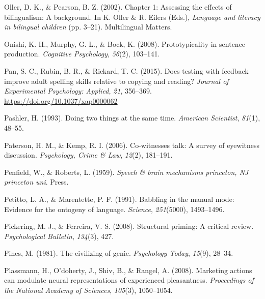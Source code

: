 \documentclass[
]{krantz}
\newlength{\cslhangindent}
\newlength{\cslentryspacingunit} %
\newenvironment{CSLReferences}[2] %
 {%
  \setlength{\parindent}{0pt}
  \ifodd #1
  \let\oldpar\par
  \def\par{\hangindent=\cslhangindent\oldpar}
  \fi
  \setlength{\parskip}{#2\cslentryspacingunit}
 }%
 {}
\begin{document}
\begin{CSLReferences}{1}{0}
\leavevmode{}%
Oller, D. K., \& Pearson, B. Z. (2002). Chapter 1: Assessing the effects of bilingualism: A background. In K. Oller \& R. Eilers (Eds.), \emph{Language and literacy in bilingual children} (pp. 3--21). Multilingual Matters.

\leavevmode{}%
Onishi, K. H., Murphy, G. L., \& Bock, K. (2008). Prototypicality in sentence production. \emph{Cognitive Psychology}, \emph{56}(2), 103--141.

\leavevmode{}%
Pan, S. C., Rubin, B. R., \& Rickard, T. C. (2015). Does testing with feedback improve adult spelling skills relative to copying and reading? \emph{Journal of Experimental Psychology: Applied}, \emph{21}, 356--369. \url{https://doi.org/10.1037/xap0000062}

\leavevmode{}%
Pashler, H. (1993). Doing two things at the same time. \emph{American Scientist}, \emph{81}(1), 48--55.

\leavevmode{}%
Paterson, H. M., \& Kemp, R. I. (2006). Co-witnesses talk: A survey of eyewitness discussion. \emph{Psychology, Crime \& Law}, \emph{12}(2), 181--191.

\leavevmode{}%
Penfield, W., \& Roberts, L. (1959). \emph{Speech \& brain mechanisms princeton, NJ princeton uni}. Press.

\leavevmode{}%
Petitto, L. A., \& Marentette, P. F. (1991). Babbling in the manual mode: Evidence for the ontogeny of language. \emph{Science}, \emph{251}(5000), 1493--1496.

\leavevmode{}%
Pickering, M. J., \& Ferreira, V. S. (2008). Structural priming: A critical review. \emph{Psychological Bulletin}, \emph{134}(3), 427.

\leavevmode{}%
Pines, M. (1981). The civilizing of genie. \emph{Psychology Today}, \emph{15}(9), 28--34.

\leavevmode{}%
Plassmann, H., O'doherty, J., Shiv, B., \& Rangel, A. (2008). Marketing actions can modulate neural representations of experienced pleasantness. \emph{Proceedings of the National Academy of Sciences}, \emph{105}(3), 1050--1054.


\end{CSLReferences}
\end{document}
